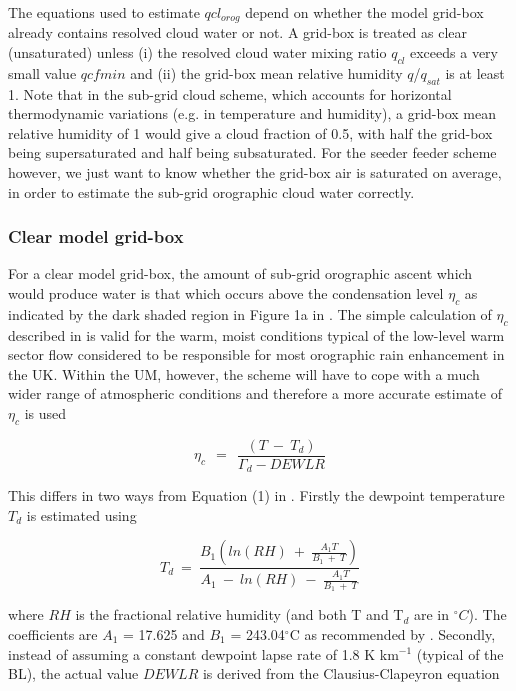 \documentclass{UMDP_article}
\begin{document}
The equations used to estimate $qcl_{orog}$ depend on whether the model grid-box already contains resolved cloud water or not.  A grid-box is treated as clear (unsaturated) unless (i) the resolved cloud water mixing ratio $q_{cl}$ exceeds a very small value $qcfmin$ and (ii) the grid-box mean relative humidity $q$/$q_{sat}$ is at least 1.  Note that in the sub-grid cloud scheme, which accounts for horizontal thermodynamic variations (e.g. in temperature and humidity), a grid-box mean relative humidity of 1 would give a cloud fraction of 0.5, with half the grid-box being supersaturated and half being subsaturated.  For the seeder feeder scheme however, we just want to know whether the grid-box air is saturated on average, in order to estimate the sub-grid orographic cloud water correctly.  
 


\subsubsection{Clear model grid-box}

For a clear model grid-box, the amount of sub-grid orographic ascent which would produce water is that which occurs above the condensation level $\eta_c$ as indicated by the dark shaded region in Figure 1a in \cite{Smith:etal:2016}.  
The simple calculation of $\eta_c$ described in \cite{Smith:etal:2016} is valid for the warm, moist conditions typical of the  low-level warm sector flow considered to be responsible for most orographic rain enhancement in the UK.  
Within the UM, however, the scheme will have to cope with a much wider range of atmospheric conditions and therefore a more accurate estimate of $\eta_c$ is used

\begin{equation} 
\eta_c ~~=~~ \frac{(T ~-~ T_d)}{\Gamma_d - DEWLR}
\end{equation}

This differs in two ways from Equation (1) in \cite{Smith:etal:2016}.  Firstly the dewpoint temperature $T_d$ is estimated using 

\begin{equation} 
T_d ~=~ \frac{ B_1 ( ln(RH) ~+~ \frac{A_1 T}{B_1 ~+~ T} ) }{  A_1 ~-~ ln(RH) ~-~ \frac{A_1 T}{B_1 ~+~ T} }
\end{equation}

where $RH$ is the fractional relative humidity (and both T and T$_d$ are in $^{\circ}C$).  The coefficients are $A_1$ = 17.625 and $B_1$ = 243.04$^{\circ}$C as recommended by \cite{Alduchov:Eskridge:1996}.  Secondly, instead of assuming a constant dewpoint lapse 
rate of 1.8 K km$^{-1}$ (typical of the BL), the actual value $DEWLR$ is derived from the Clausius-Clapeyron equation \citep{McIlveen:2010}
\end{document}

